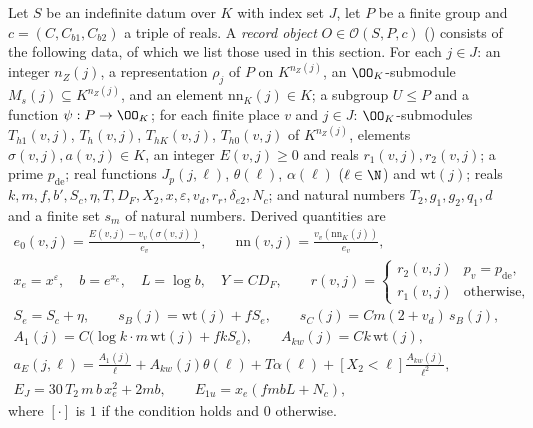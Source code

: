 \begin{definition}\label{pf:onto2:onobj}
Let $S$ be an indefinite datum over $K$ with index set $J$, let $P$ be a finite group and $c=(C,C_{b1},C_{b2})$ a
triple of reals. A \emph{record object} $O\in\mathcal O(S,P,c)$ () consists
of the following data, of which we list those used in this section. For each $j\in J$: an integer $n_Z(j)$, a
representation $\rho_j$ of $P$ on $K^{n_Z(j)}$, an $\OO_K$-submodule $M_s(j)\subseteq K^{n_Z(j)}$, and an element
$\mathrm{nn}_K(j)\in K$; a subgroup $U\le P$ and a function $\psi:P\to\OO_K$; for each finite place $v$ and $j\in J$:
$\OO_K$-submodules $T_{h1}(v,j)$, $T_h(v,j)$, $T_{hK}(v,j)$, $T_{h0}(v,j)$ of $K^{n_Z(j)}$, elements
$\sigma(v,j),a(v,j)\in K$, an integer $E(v,j)\ge0$ and reals $r_1(v,j),r_2(v,j)$; a prime $p_{\mathrm{de}}$; real
functions $J_p(j,\ell)$, $\theta(\ell)$, $\alpha(\ell)$ ($\ell\in\N$) and $\mathrm{wt}(j)$; reals
$k,m,f,b',S_c,\eta,T,D_F,X_2,x,\varepsilon,v_d,r_r,\delta_{e2},N_c$; and natural numbers $T_2,g_1,g_2,q_1,d$ and a finite
set $s_m$ of natural numbers. Derived quantities are
\begin{gather*}
e_0(v,j)=\frac{E(v,j)-v_v(\sigma(v,j))}{e_v},\qquad \mathrm{nn}(v,j)=\frac{v_v(\mathrm{nn}_K(j))}{e_v},\\
x_e=x^{\varepsilon},\quad b=e^{x_e},\quad L=\log b,\quad Y=C D_F,\qquad
r(v,j)=\begin{cases} r_2(v,j)&p_v=p_{\mathrm{de}},\\ r_1(v,j)&\text{otherwise},\end{cases}\\
S_e=S_c+\eta,\qquad s_B(j)=\mathrm{wt}(j)+fS_e,\qquad s_C(j)=Cm(2+v_d)\,s_B(j),\\
A_1(j)=C\bigl(\log k\cdot m\,\mathrm{wt}(j)+fkS_e\bigr),\qquad A_{kw}(j)=Ck\,\mathrm{wt}(j),\\
a_E(j,\ell)=\frac{A_1(j)}{\ell}+A_{kw}(j)\theta(\ell)+T\alpha(\ell)+[X_2<\ell]\frac{A_{kw}(j)}{\ell^2},\\
E_J=30\,T_2\,m\,b\,x_e^2+2mb,\qquad E_{1u}=x_e(fmbL+N_c),
\end{gather*}
where $[\cdot]$ is $1$ if the condition holds and $0$ otherwise.
\end{definition}

